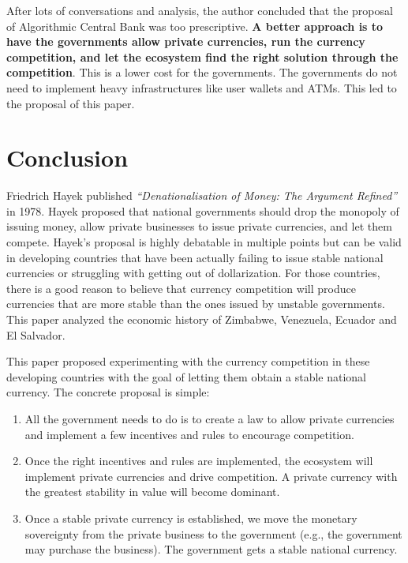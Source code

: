 \documentclass[dvipdfmx,a4paper]{article}
\begin{document}
After lots of conversations and analysis, the author concluded that the proposal of Algorithmic Central Bank was too prescriptive. \textbf{A better approach is to have the governments allow private currencies, run the currency competition, and let the ecosystem find the right solution through the competition}. This is a lower cost for the governments. The governments do not need to implement heavy infrastructures like user wallets and ATMs. This led to the proposal of this paper.

\section{Conclusion}

Friedrich Hayek published \textit{``Denationalisation of Money: The Argument Refined''} in 1978. Hayek proposed that national governments should drop the monopoly of issuing money, allow private businesses to issue private currencies, and let them compete. Hayek's proposal is highly debatable in multiple points but can be valid in developing countries that have been actually failing to issue stable national currencies or struggling with getting out of dollarization. For those countries, there is a good reason to believe that currency competition will produce currencies that are more stable than the ones issued by unstable governments. This paper analyzed the economic history of Zimbabwe, Venezuela, Ecuador and El Salvador.

This paper proposed experimenting with the currency competition in these developing countries with the goal of letting them obtain a stable national currency. The concrete proposal is simple:

\begin{enumerate}
\item All the government needs to do is to create a law to allow private currencies and implement a few incentives and rules to encourage competition.
\item Once the right incentives and rules are implemented, the ecosystem will implement private currencies and drive competition. A private currency with the greatest stability in value will become dominant.
\item Once a stable private currency is established, we move the monetary sovereignty from the private business to the government (e.g., the government may purchase the business). The government gets a stable national currency.
\end{enumerate}



\end{document}
